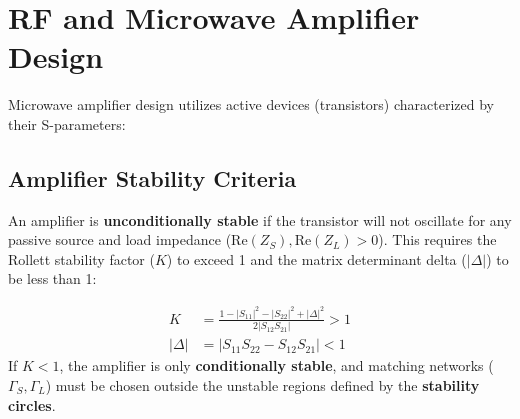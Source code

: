 \documentclass[12pt,a4paper]{article}
\begin{document}
\section{RF and Microwave Amplifier Design}

Microwave amplifier design utilizes active devices (transistors) characterized by their S-parameters:

\begin{tcolorbox}[tikzbox, title={Microwave Transistor Amplifier Block Diagram}]
\centering
{}
\end{tcolorbox}

\subsection{Amplifier Stability Criteria}
An amplifier is \textbf{unconditionally stable} if the transistor will not oscillate for any passive source and load impedance ($\text{Re}(Z_S), \text{Re}(Z_L) > 0$).
This requires the Rollett stability factor ($K$) to exceed 1 and the matrix determinant delta ($|\Delta|$) to be less than 1:

\begin{tcolorbox}[formulabox, title={\textbf{Rollett Stability Criteria}}]
\begin{align}
  K &= \frac{1 - |S_{11}|^2 - |S_{22}|^2 + |\Delta|^2}{2 |S_{12} S_{21}|} > 1 \\
  |\Delta| &= |S_{11}S_{22} - S_{12}S_{21}| < 1
\end{align}
If $K < 1$, the amplifier is only \textbf{conditionally stable}, and matching networks ($\Gamma_S, \Gamma_L$) must be chosen outside the unstable regions defined by the \textbf{stability circles}.
\end{tcolorbox}
\end{document}
